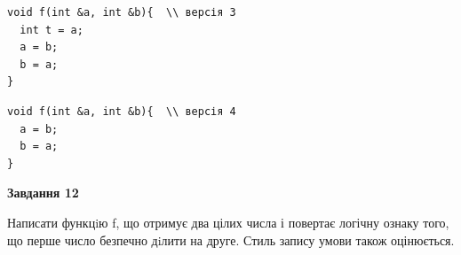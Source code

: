 \documentclass[12pt, ukrainian]{article}
\begin{document}
{\begin {large}
\begin{minipage}[t]{11.0cm}
\vspace{-8mm}\begin{verbatim}
void f(int &a, int &b){  \\ версія 3
  int t = a;
  a = b;
  b = a;
}
\end{verbatim}

\vspace{-8mm}\begin{verbatim}
void f(int &a, int &b){  \\ версія 4
  a = b;
  b = a;
}
\end{verbatim}



\begin{center}
\textbf{Завдання 12}
\end{center}

Написати функцiю f, що отримує два цілих числа і повертає логічну ознаку того, що перше число безпечно дiлити на друге. Стиль запису умови також оцінюється.\par

\end{minipage}

\end {large}}
\newpage
\end{document}
